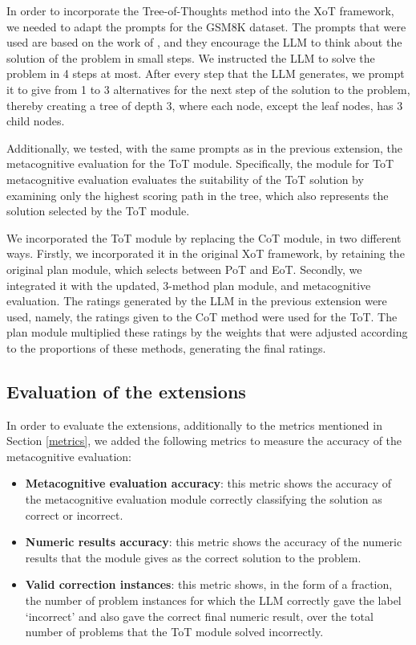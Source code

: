 \documentclass[10pt]{article} %
\begin{document}
In order to incorporate the Tree-of-Thoughts method into the XoT framework, we needed to adapt the prompts for the GSM8K dataset. The prompts that were used are based on the work of \cite{pandit2023tree}, and they encourage the LLM to think about the solution of the problem in small steps. We instructed the LLM to solve the problem in 4 steps at most. After every step that the LLM generates, we prompt it to give from 1 to 3 alternatives for the next step of the solution to the problem, thereby creating a tree of depth 3, where each node, except the leaf nodes, has 3 child nodes.

Additionally, we tested, with the same prompts as in the previous extension, the metacognitive evaluation for the ToT module. Specifically, the module for ToT metacognitive evaluation evaluates the suitability of the ToT solution by examining only the highest scoring path in the tree, which also represents the solution selected by the ToT module.

We incorporated the ToT module by replacing the CoT module, in two different ways. Firstly, we incorporated it in the original XoT framework, by retaining the original plan module, which selects between PoT and EoT.  Secondly, we integrated it with the updated, 3-method plan module, and metacognitive evaluation. The ratings generated by the LLM in the previous extension were used, namely, the ratings given to the CoT method were used for the ToT. The plan module multiplied these ratings by the weights that were adjusted according to the proportions of these methods, generating the final ratings.

\subsection{Evaluation of the extensions}

In order to evaluate the extensions, additionally to the metrics mentioned in Section \ref{metrics}, we added the following metrics to measure the accuracy of the metacognitive evaluation:

\begin{itemize}  
  \item \textbf{Metacognitive evaluation accuracy}: this metric shows the accuracy of the metacognitive evaluation module correctly classifying the solution as correct or incorrect.
  \item \textbf{Numeric results accuracy}: this metric shows the accuracy of the numeric results that the module gives as the correct solution to the problem.  
  \item \textbf{Valid correction instances}: this metric shows, in the form of a fraction, the number of problem instances for which the LLM correctly gave the label `incorrect' and also gave the correct final numeric result, over the total number of problems that the ToT module solved incorrectly.
\end{itemize}
\end{document}
